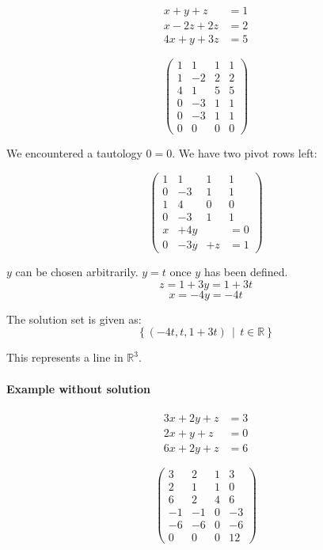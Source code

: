 \documentclass[a4paper,landscape,twocolumn]{article}
\newcommand\setdef[2]{\left\{#1\,\middle|\,#2\right\}}
\begin{document}
\begin{align*}
  x + y + z &= 1 \\
  x - 2z + 2z &= 2 \\
  4x + y + 3z &= 5
\end{align*}

\[
  \left(\begin{array}{ccc|c}
     1 &  1 &  1 & 1 \\
     1 & -2 &  2 & 2 \\
     4 &  1 &  5 & 5 \\
   \hline
     0 & -3 &  1 & 1 \\
     0 & -3 &  1 & 1 \\
   \hline
     0 &  0 &  0 & 0
  \end{array}\right)
\]

We encountered a tautology $0 = 0$. We have two pivot rows left:

\[
  \left(\begin{array}{ccc|c}
     1 &  1 &  1 & 1 \\
     0 & -3 &  1 & 1 \\
   \hline
     1 &  4 &  0 & 0 \\
     0 & -3 &  1 & 1 \\
   \hline
     x & +4y &    &= 0 \\
     0 & -3y & +z &= 1
  \end{array}\right)
\]

$y$ can be chosen arbitrarily. $y = t$ once $y$ has been defined.
\[ z = 1 + 3y = 1 + 3t \]
\[ x = -4y = -4t \]

The solution set is given as:
\[ \setdef{(-4t, t, 1 + 3t)}{t \in \mathbb{R}} \]

This represents a line in $\mathbb{R}^3$.

\paragraph{Example without solution}
\begin{align*}
  3x + 2y + z & =3 \\
  2x +  y + z &= 0 \\
  6x + 2y + z &= 6
\end{align*}

\[
  \left(\begin{array}{ccc|c}
      3 &  2 &  1 & 3 \\
      2 &  1 &  1 & 0 \\
      6 &  2 &  4 & 6 \\
   \hline
     -1 & -1 &  0 & -3 \\
     -6 & -6 &  0 & -6 \\
   \hline
     0 &   0 &  0 & 12
  \end{array}\right)
\]
\end{document}
